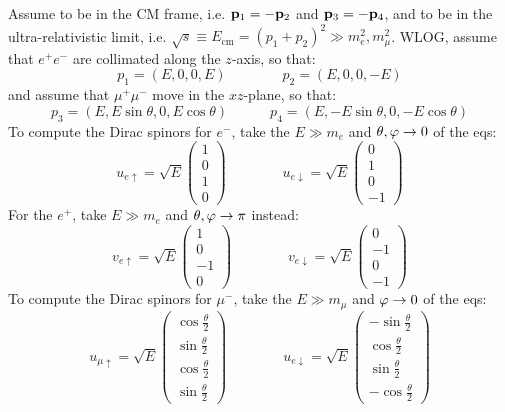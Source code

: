 Assume to be in the CM frame, i.e. $ \mathbf{p}_1 = - \mathbf{p}_2 $ and $ \mathbf{p}_3 = - \mathbf{p}_4 $, and to be in the ultra-relativistic limit, i.e. $ \sqrt{s} \equiv E_\text{cm} = (p_1 + p_2)^2 \gg m_e^2 , m_\mu^2 $. WLOG, assume that $ e^+ e^- $ are collimated along the $ z $-axis, so that:
\begin{equation*}
  p_1 = (E, 0, 0, E)
  \qquad \qquad
  p_2 = (E, 0, 0, -E)
\end{equation*}
and assume that $ \mu^+ \mu^- $ move in the $ xz $-plane, so that:
\begin{equation*}
  p_3 = (E, E \sin \theta, 0, E \cos \theta)
  \qquad \quad
  p_4 = (E, -E \sin \theta, 0, -E \cos \theta)
\end{equation*}
To compute the Dirac spinors for $ e^- $, take the $ E \gg m_e $ and $ \theta , \varphi \rightarrow 0 $ of the eqs:
\begin{equation*}
  u_{e \uparrow} = \sqrt{E}
  \begin{pmatrix}
    1 \\ 0 \\ 1 \\ 0
  \end{pmatrix}
  \qquad \qquad
  u_{e \downarrow} = \sqrt{E}
  \begin{pmatrix}
    0 \\ 1 \\ 0 \\ -1
  \end{pmatrix}
\end{equation*}
For the $ e^+ $, take $ E \gg m_e $ and $ \theta , \varphi \rightarrow \pi $ instead:
\begin{equation*}
  v_{e \uparrow} = \sqrt{E}
  \begin{pmatrix}
    1 \\ 0 \\ -1 \\ 0
  \end{pmatrix}
  \qquad \qquad
  v_{e \downarrow} = \sqrt{E}
  \begin{pmatrix}
    0 \\ -1 \\ 0 \\ -1
  \end{pmatrix}
\end{equation*}
To compute the Dirac spinors for $ \mu^- $, take the $ E \gg m_\mu $ and $ \varphi \rightarrow 0 $ of the eqs:
\begin{equation*}
  u_{\mu \uparrow} = \sqrt{E}
  \begin{pmatrix}
    \cos \frac{\theta}{2} \\ \sin \frac{\theta}{2} \\ \cos \frac{\theta}{2} \\ \sin \frac{\theta}{2}
  \end{pmatrix}
  \qquad \qquad
  u_{e \downarrow} = \sqrt{E}
  \begin{pmatrix}
    - \sin \frac{\theta}{2} \\ \cos \frac{\theta}{2} \\ \sin \frac{\theta}{2} \\ - \cos \frac{\theta}{2}
  \end{pmatrix}
\end{equation*}
